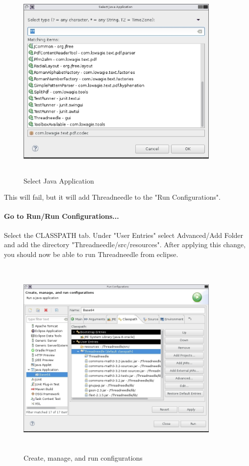\documentclass[a4latex]{article}
\begin{document}
\begin{figure}[ht]
\centering
\includegraphics[height=10cm,width=10cm]{images/fig_select.eps}
\caption{Select Java Application}
\label{fig:select}
\end{figure}

This will fail, but it will add Threadneedle to the "Run Configurations".
\newpage
\paragraph{Go to Run/Run Configurations...}
Select the CLASSPATH tab. Under
"User Entries" select Advanced/Add Folder and add the directory "Threadneedle/src/resources". After applying this change, you should now be able to run 
Threadneedle from eclipse.

\begin{figure}[ht]
\centering
\includegraphics[height=10cm,width=10cm]{images/fig_runconfig}
\caption{Create, manage, and run configurations}
\label{fig:run}
\end{figure}
\end{document}
